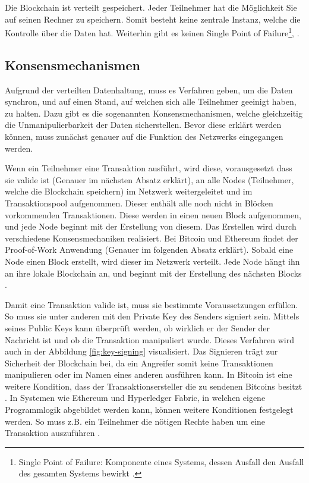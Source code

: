 Die Blockchain ist verteilt gespeichert. Jeder Teilnehmer hat die Möglichkeit Sie auf seinen Rechner zu speichern. Somit besteht keine zentrale Instanz, welche die Kontrolle über die Daten hat. Weiterhin gibt es keinen Single Point of Failure\footnote{Single Point of Failure: Komponente eines Systems, dessen Ausfall den Ausfall des gesamten Systems bewirkt \cite{SinglePointFailure2016}.},  \cite{CrosbyBlockChainTechnologyBitcoin2016}.

\label{subsec:konsens}
\subsection{Konsensmechanismen}

Aufgrund der verteilten Datenhaltung, muss es Verfahren geben, um die Daten synchron, und auf einen Stand, auf welchen sich alle Teilnehmer geeinigt haben, zu halten. Dazu gibt es die sogenannten Konsensmechanismen, welche gleichzeitig die Unmanipulierbarkeit der Daten sicherstellen. Bevor diese erklärt werden können, muss zunächst genauer auf die Funktion des Netzwerks eingegangen werden.

Wenn ein Teilnehmer eine Transaktion ausführt, wird diese, vorausgesetzt dass sie valide ist (Genauer im nächsten Absatz erklärt), an alle Nodes (Teilnehmer, welche die Blockchain speichern) im Netzwerk weitergeleitet und im Transaktionspool aufgenommen. Dieser enthält alle noch nicht in Blöcken vorkommenden Transaktionen. Diese werden in einen neuen Block aufgenommen, und jede Node beginnt mit der Erstellung von diesem. Das Erstellen wird durch verschiedene Konsensmechaniken realisiert. Bei Bitcoin und Ethereum findet der Proof-of-Work Anwendung (Genauer im folgenden Absatz erklärt). Sobald eine Node einen Block erstellt, wird dieser im Netzwerk verteilt. Jede Node hängt ihn an ihre lokale Blockchain an, und beginnt mit der Erstellung des nächsten Blocks \cite{MAntonopoulosMasteringbitcoin2015}.

Damit eine Transaktion valide ist, muss sie bestimmte Voraussetzungen erfüllen. So muss sie unter anderen mit den Private Key des Senders signiert sein. Mittels seines Public Keys kann überprüft werden, ob wirklich er der Sender der Nachricht ist und ob die Transaktion manipuliert wurde. Dieses Verfahren wird auch in der Abbildung \ref{fig:key-signing} visualisiert. Das Signieren trägt zur Sicherheit der Blockchain bei, da ein Angreifer somit keine Transaktionen manipulieren oder im Namen eines anderen ausführen kann. In Bitcoin ist eine weitere Kondition, dass der Transaktionsersteller die zu sendenen Bitcoins besitzt \cite{AntonopoulosMasteringbitcoin2015}. In Systemen wie Ethereum und Hyperledger Fabric, in welchen eigene Programmlogik abgebildet werden kann, können weitere Konditionen festgelegt werden. So muss z.B. ein Teilnehmer die nötigen Rechte haben um eine Transaktion auszuführen \cite{AccessControlLanguage}.

